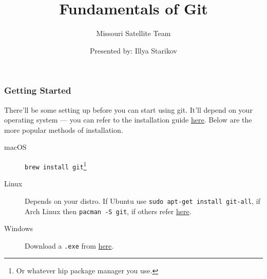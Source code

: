 \documentclass{beamer}
\title{Fundamentals of Git}
\subtitle{Missouri Satellite Team}
\author{Presented by: Illya Starikov}
\date{ }
\newcommand{\shellcmd}[1]{\texttt{\colorbox{gray!30}{#1}}}
\begin{document}
\begin{frame}
    \maketitle
\end{frame}

\begin{frame}
    \frametitle{Getting Started}

    There'll be some setting up before you can start using git. It'll depend on your operating system --- you can refer to the installation guide
    \href{https://git-scm.com/book/en/v2/Getting-Started-Installing-Git}{here}.
    Below are the more popular methods of installation.

    \begin{description}
        \item[macOS] \shellcmd{brew install git}\footnote{Or whatever hip package manager you use.}
        \item[Linux] Depends on your distro. If Ubuntu use \shellcmd{sudo apt-get install git-all}, if Arch Linux then \shellcmd{pacman -S git}, if others refer \href{https://git-scm.com/download/linux}{here}.
        \item[Windows] Download a \texttt{.exe} from \href{https://git-scm.com/download/win}{here}.
    \end{description}

\end{frame}
\end{document}
